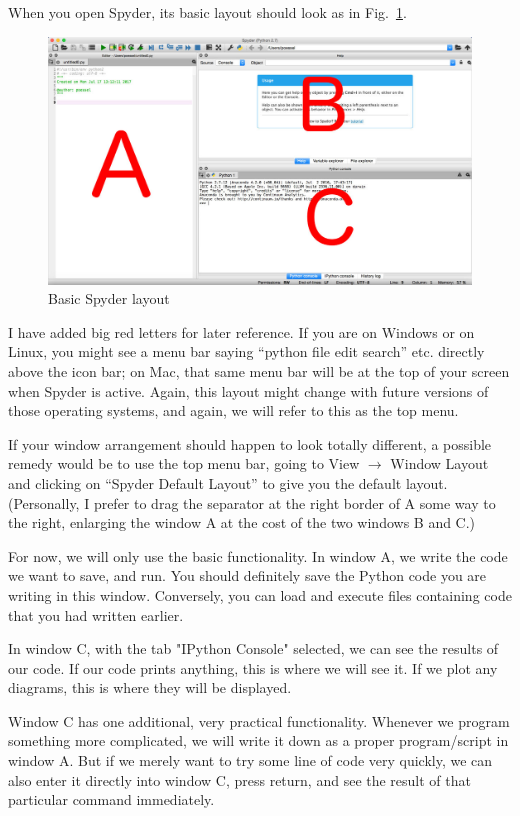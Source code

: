 \documentclass[twocolumn,apj]{openjournal}
\begin{document}
When you open Spyder, its basic layout should look as in Fig.~\ref{SpyderDefault}.
\begin{figure}[thbp]
\begin{center}
\includegraphics[width=\linewidth]{spyder-default.jpg}
\caption{Basic Spyder layout}
\label{SpyderDefault}
\end{center}
\end{figure}
I have added big red letters for later reference. If you are on Windows or on Linux, you might see a menu bar saying ``python file edit search'' etc. directly above the icon bar; on Mac, that same menu bar will be at the top of your screen when Spyder is active. Again, this layout might change with future versions of those operating systems, and again, we will refer to this as the top menu.

If your window arrangement should happen to look totally different, a possible remedy would be to use the top menu bar, going to View $\to$ Window Layout and clicking on ``Spyder Default Layout'' to give you the default layout. (Personally, I prefer to drag the separator at the right border of A some way to the right, enlarging the window A at the cost of the two windows B and C.)

For now, we will only use the basic functionality. In window A, we write the code we want to save, and run. You should definitely save the Python code you are writing in this window. Conversely, you can load and execute files containing code that you had written earlier.

In window C, with the tab "IPython Console" selected, we can see the results of our code. If our code prints anything, this is where we will see it. If we plot any diagrams, this is where they will be displayed. 

Window C has one additional, very practical functionality. Whenever we program something more complicated, we will write it down as a proper program/script in window A. But if we merely want to try some line of code very quickly, we can also enter it directly into window C, press return, and see the result of that particular command immediately.
\end{document}
